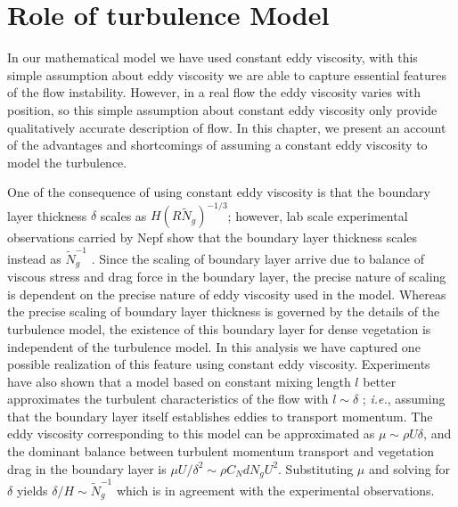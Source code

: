 \documentclass[12pt]{report}   %
\newcommand{\Rey}{{R}}
\newcommand{\Ndg}{\tilde{N}_g}
\newcommand{\ReyNdg}{{\Rey\Ndg}}
\begin{document}
\section{Role of turbulence Model}
In our mathematical model we have used constant eddy viscosity, with this simple assumption about eddy viscosity we are able to capture essential features of the flow instability. However, in a real flow the eddy viscosity varies with position, so this simple assumption about constant eddy viscosity only provide qualitatively accurate description of flow. 
In this chapter, we present an account of the advantages and shortcomings of assuming a constant eddy viscosity to model the turbulence.

One of the consequence of using constant eddy viscosity is that the boundary layer thickness $\delta$ scales as $H(\ReyNdg)^{-1/3}$; however,
lab scale experimental observations carried by Nepf \cite{Nepf07} show that the boundary layer thickness scales instead as $\Ndg^{-1}$ \cite{Nepf07}.
Since the scaling of boundary layer arrive due to balance of viscous stress and drag force in the boundary layer, the precise nature of scaling is dependent on the precise nature of eddy viscosity used in the model. Whereas the precise scaling of boundary layer thickness is governed by the details of the turbulence model, the existence of this boundary layer for dense vegetation is independent of the turbulence model. In this analysis we have captured one possible realization of this feature using constant eddy viscosity.
Experiments have also shown that a model based on constant mixing length $l$ better approximates the turbulent characteristics of the flow with $l \sim \delta$ \cite{White06,Nepf07}; \textit{i.e.}, assuming that the boundary layer itself establishes eddies to transport momentum. 
The eddy viscosity corresponding to this model can be approximated as $\mu \sim \rho U \delta$, and the dominant balance between turbulent momentum transport and vegetation drag in the boundary layer is  $\mu U/\delta^2 \sim \rho C_N d N_g U^2$.
Substituting $\mu$ and solving for $\delta$ yields $\delta/H \sim \Ndg^{-1}$ which is in agreement with the experimental observations.
\end{document}
